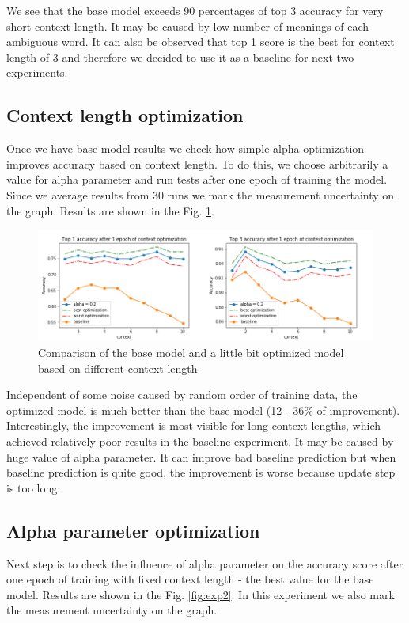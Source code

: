 \documentclass{llncs}
\begin{document}
We see that the base model exceeds 90 percentages of top 3 accuracy for very short context length. It may be caused by low number of meanings of each ambiguous word.
It can also be observed that top 1 score is the best for context length of 3 and therefore we decided to use it as a baseline for next two experiments.

\subsection{Context length optimization}
Once we have base model results we check how simple alpha optimization improves accuracy based on context length. To do this, we choose arbitrarily a value for alpha parameter and run tests after one epoch of training the model. Since we average results from 30 runs we mark the measurement uncertainty on the graph. Results are shown in the Fig. \ref{fig:exp1}.
\begin{figure}
    \label{fig:exp1}
    \caption{Comparison of the base model and a little bit optimized model based on different context length}
    \includegraphics[scale=0.6]{res/exp1_context_top_acc.png}
\end{figure}
Independent of some noise caused by random order of training data, the optimized model is much better than the base model (12 - 36\% of improvement). Interestingly, the improvement is most visible for long context lengths, which achieved relatively poor results in the baseline experiment. It may be caused by huge value of alpha parameter. It can improve bad baseline prediction but when baseline prediction is quite good, the improvement is worse because update step is too long.

\subsection{Alpha parameter optimization}
Next step is to check the influence of alpha parameter on the accuracy score after one epoch of training with fixed context length - the best value for the base model. Results are shown in the Fig. \ref{fig:exp2}. In this experiment we also mark the measurement uncertainty on the graph.
\end{document}
